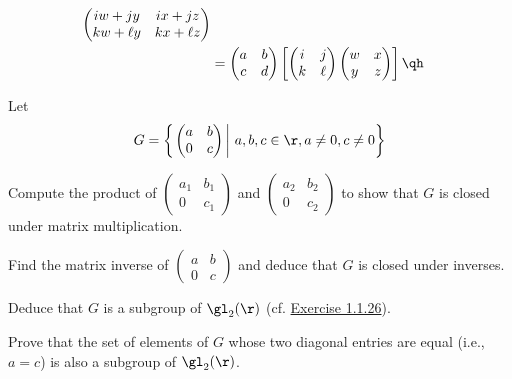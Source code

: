 \begin{sol}
\begin{align*}
\begin{pmatrix}
            iw  + jy & ix + jz \\
            kw + \ell y & kx + \ell z
        \end{pmatrix} \\
        & = 
        \begin{pmatrix}
            a & b \\
            c & d
        \end{pmatrix}
        \left[
        \begin{pmatrix}
            i & j \\
            k & \ell
        \end{pmatrix}
        \begin{pmatrix}
            w & x \\
            y & z
        \end{pmatrix}
        \right] \qh
    \end{align*}
\end{sol}

\begin{exercise}\label{ex1.4.10}
    Let
    $$G = \left\{\left.
    \begin{pmatrix}
        a & b \\
        0 & c
    \end{pmatrix}\,\right|\, a, b, c \in \r, a \neq 0, c \neq 0\right\}$$
    \begin{subproblems}
        \item Compute the product of $
        \begin{pmatrix}
            a_1 & b_1 \\
            0 & c_1
        \end{pmatrix}$ and $
        \begin{pmatrix}
            a_2 & b_2 \\
            0 & c_2
        \end{pmatrix}$ to show that $G$ is closed under matrix multiplication.
        \item Find the matrix inverse of $
        \begin{pmatrix}
            a & b \\
            0 & c
        \end{pmatrix}$ and deduce that $G$ is closed under inverses.
        \item Deduce that $G$ is a subgroup of $\gl_2(\r)$ (cf. \hyperref[ex1.1.26]{Exercise 1.1.26}).
        \item Prove that the set of elements of $G$ whose two diagonal entries are equal (i.e., $a = c$) is also a subgroup of $\gl_2(\r)$.
    \end{subproblems}
\end{exercise}

